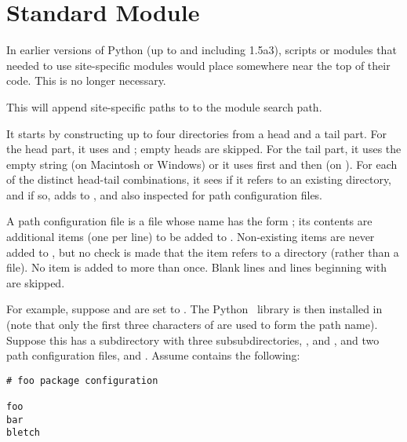 \section{Standard Module }
\label{module-site}


In earlier versions of Python (up to and including 1.5a3), scripts or
modules that needed to use site-specific modules would place
 somewhere near the top of their code.  This is no
longer necessary.

This will append site-specific paths to to the module search path.

It starts by constructing up to four directories from a head and a
tail part.  For the head part, it uses  and
; empty heads are skipped.  For
the tail part, it uses the empty string (on Macintosh or Windows) or
it uses first  and then
 (on \UNIX{}).  For each of the distinct
head-tail combinations, it sees if it refers to an existing directory,
and if so, adds to , and also inspected for path
configuration files.

A path configuration file is a file whose name has the form
; its contents are additional items (one
per line) to be added to .  Non-existing items are
never added to , but no check is made that the item
refers to a directory (rather than a file).  No item is added to
 more than once.  Blank lines and lines beginning with
\code{\#} are skipped.

For example, suppose  and  are
set to .  The Python \version\ library is then
installed in  (note that only the first 
three characters of  are used to form the path
name).  Suppose this has a subdirectory
 with three
subsubdirectories, ,  and , and two
path configuration files,  and .  Assume
 contains the following:

\begin{verbatim}
# foo package configuration

foo
bar
bletch
\end{verbatim}


